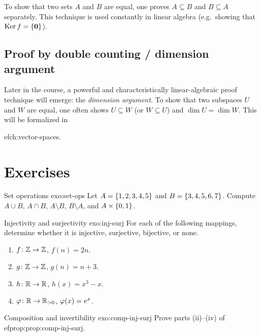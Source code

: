 To show that two sets $A$ and $B$ are equal, one proves $A\subseteq B$
and $B\subseteq A$ separately. This technique is used constantly in
linear algebra (e.g.\ showing that $\operatorname{Ker} f = \left\{\mathbf{0}\right\}$).

\subsection{Proof by double counting / dimension argument}\label{subsec:dim-argument}

Later in the course, a powerful and characteristically linear-algebraic
proof technique will emerge: the \emph{dimension argument}. To show that
two subspaces $U$ and $W$ are equal, one often shows $U\subseteq W$ (or
$W\subseteq U$) and $\dim U = \dim W$. This will be formalized in

ef{ch:vector-spaces}.


\section{Exercises}\label{sec:ch0-exercises}

\begin{exercise}{Set operations \basic}{exo:set-ops}
Let $A=\left\{1,2,3,4,5\right\}$ and $B=\left\{3,4,5,6,7\right\}$.
Compute $A\cup B$, $A\cap B$, $A\setminus B$, $B\setminus A$, and
$A\times\left\{0,1\right\}$.
\end{exercise}

\begin{exercise}{Injectivity and surjectivity \basic}{exo:inj-surj}
For each of the following mappings, determine whether it is injective,
surjective, bijective, or none.
\begin{enumerate}[label=(\alph*)]
  \item $f\colon{\mathbb{Z}}\to{\mathbb{Z}}$, $f(n)=2n$.
  \item $g\colon{\mathbb{Z}}\to{\mathbb{Z}}$, $g(n)=n+3$.
  \item $h\colon{\mathbb{R}}\to{\mathbb{R}}$, $h(x)=x^3-x$.
  \item $\varphi\colon{\mathbb{R}}\to{\mathbb{R}}_{>0}$, $\varphi(x)=e^x$.
\end{enumerate}
\end{exercise}

\begin{exercise}{Composition and invertibility \intermediate}{exo:comp-inj-surj}
Prove parts (ii)--(iv) of 
ef{prop:prop:comp-inj-surj}.
\end{exercise}

